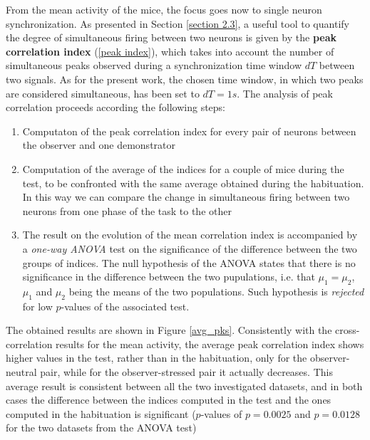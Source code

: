 \documentclass[12pt, a4paper]{report}
\begin{document}
From the mean activity of the mice, the focus goes now to single neuron synchronization. As presented in Section \ref{section 2.3}, a useful tool to quantify the degree of simultaneous firing between two neurons is given by the \textbf{peak correlation index} (\ref{peak index}), which takes into account the number of simultaneous peaks observed during a synchronization time window $dT$ between two signals. As for the present work, the chosen time window, in which two peaks are considered simultaneous, has been set to $dT = 1 s$. The analysis of peak correlation proceeds according the following steps:

\begin{enumerate}
	
	\item Computaton of the peak correlation index for every pair of neurons between the observer and one demonstrator 
	
	\item Computation of the average of the indices for a couple of mice during the test, to be confronted with the same average obtained during the habituation. In this way we can compare the change in simultaneous firing between two neurons from one phase of the task to the other
	
	\item The result on the evolution of the mean correlation index is accompanied by a \textit{one-way ANOVA} test \cite{17} on the significance of the difference between the two groups of indices. The null hypothesis of the ANOVA states that there is no significance in the difference between the two pupulations, i.e. that $ \mu_1 = \mu_2$,  $\mu_1$  and $ \mu_2$ being the  means of the two populations. Such hypothesis is \textit{rejected} for low $p$-values of the associated test.
	
\end{enumerate}

The obtained results are shown in Figure \ref{avg_pks}. Consistently with the cross-correlation results for the mean activity, the average peak correlation index shows higher values in the test, rather than in the habituation, only for the observer-neutral pair, while for the observer-stressed pair it actually decreases. This average result is consistent between all the two investigated datasets, and in both cases the difference between the indices computed in the test and the ones computed in the habituation is significant ($p$-values of $p = 0.0025$ and $p = 0.0128$ for the two datasets from the ANOVA test)
\end{document}
